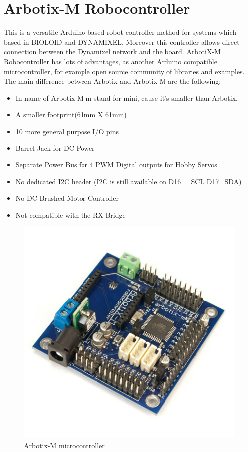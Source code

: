 			\newpage
		
	\section{Arbotix-M Robocontroller}
	
		\hspace{15pt}This is a versatile Arduino based robot controller method for systems which based in BIOLOID and DYNAMIXEL. Moreover this controller allows direct connection between the Dynamixel network and the board. ArbotiX-M Robocontroller has lots of advantages, as another Arduino compatible microcontroller, for example open source community of libraries and examples. The main difference between Arbotix and Arbotix-M are the following: 
		
		\begin{itemize}
			\item In name of Arbotix M m stand for mini, cause it’s smaller than Arbotix.
			\item A smaller footprint(61mm X 61mm)
			\item 10 more general purpose I/O pins
			\item Barrel Jack for DC Power
			\item Separate Power Bus for 4 PWM Digital outputs for Hobby Servos
			\item No dedicated I2C header (I2C is still available on D16 = SCL D17=SDA)
			\item No DC Brushed Motor Controller
			\item Not compatible with the RX-Bridge
		\end{itemize}
		
		\begin{figure}[H]
			\centering
			\includegraphics[scale=0.3]{./images/arbotix_m}
			\caption{Arbotix-M microcontroller\cite{arbotix_m}}
		\end{figure}
		

